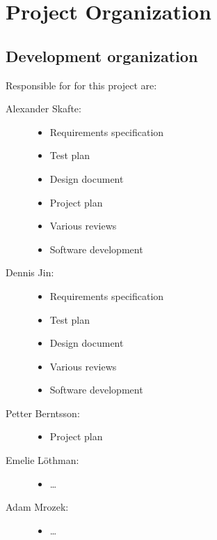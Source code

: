 \documentclass[12pt,titlepage]{article}
\begin{document}

\section{Project Organization}

\subsection{Development organization}

Responsible for for this project are:

\begin{description}
	\item[Alexander Skafte:] \hfill
		\begin{itemize}
			\item Requirements specification
			\item Test plan
			\item Design document
			\item Project plan
			\item Various reviews
			\item Software development
		\end{itemize}
	\item[Dennis Jin:] \hfill
		\begin{itemize}
			\item Requirements specification
			\item Test plan
			\item Design document
			\item Various reviews
			\item Software development
		\end{itemize}
	\item[Petter Berntsson:] \hfill
		\begin{itemize}
			\item Project plan
		\end{itemize}
	\item[Emelie Löthman:] \hfill
		\begin{itemize}
			\item \ldots
		\end{itemize}
	\item[Adam Mrozek:] \hfill
		\begin{itemize}
			\item \ldots
		\end{itemize}
\end{description}
\end{document}
